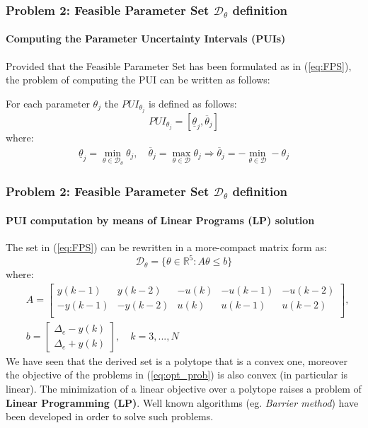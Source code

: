 \documentclass{beamer}
\begin{document}
\begin{frame}
    \frametitle{Problem 2: Feasible Parameter Set $\mathcal{D}_\theta$ definition}
    \framesubtitle{Computing the Parameter Uncertainty Intervals (PUIs)}
    Provided that the Feasible Parameter Set has been formulated as in (\ref{eq:FPS}), the problem of computing the PUI can be written as follows: 
    \begin{definition}
        For each parameter $\theta_j$ the $PUI_{\theta_j}$ is defined as follows:
        \begin{equation}
            PUI_{\theta_j} =[\underline{\theta}_j, \overline{\theta}_j]
        \end{equation}
        where: 
        \begin{align}\label{eq:opt_prob}
            \underline{\theta}_j = \min_{\theta\in\mathcal{D}_\theta} \theta_j, \quad 
            \overline{\theta}_j = \max_{\theta\in\mathcal{D}} \theta_j \Rightarrow 
            \overline{\theta}_j = -\min_{\theta\in\mathcal{D}} -\theta_j
        \end{align}
    \end{definition}
    
\end{frame}

\begin{frame}
    \frametitle{Problem 2: Feasible Parameter Set $\mathcal{D}_\theta$ definition}
    \framesubtitle{PUI computation by means of Linear Programs (LP) solution}
    The set in (\ref{eq:FPS}) can be rewritten in a more-compact matrix form as: 
    \begin{equation}
        \mathcal{D}_\theta = \{
            \theta \in \mathbb{R}^5: A\theta\le{b}
        \}
    \end{equation}
    where: 
    {\small{
        \begin{align*}
            &A=\begin{bmatrix}
                {y(k-1)}&{y(k-2)}&-{u(k)}&-{u(k-1)}&-{u(k-2)}\\
                -{y(k-1)}&-{y(k-2)}&{u(k)}&{u(k-1)}&{u(k-2)}\\
            \end{bmatrix}, \\
            &b=\begin{bmatrix}
                \Delta_e - y(k)\\
                \Delta_e + y(k)
            \end{bmatrix}, \quad 
            k=3,...,N
        \end{align*}
    }}We have seen that the derived set is a polytope that is a convex one, moreover the objective of the problems in (\ref{eq:opt_prob}) is also convex (in particular is linear). The minimization of a linear objective over a polytope raises a problem of \alert{\textbf{Linear Programming (LP)}}. Well known algorithms (eg. \textit{Barrier method}) have been developed in order to solve such problems.
\end{frame}
\end{document}

